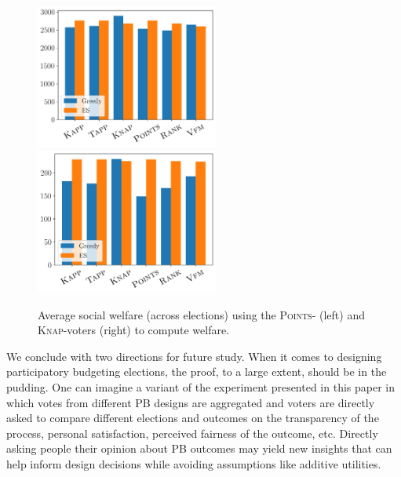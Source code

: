\documentclass[runningheads]{llncs}
\newcommand{\points}{\textsc{Points}}
\newcommand{\knap}{\textsc{Knap}}
\begin{document}
\begin{figure}[!t]
\begin{center}
\includegraphics[width=6cm]{experiment/Utilities_welfare.png}
\includegraphics[width=6cm]{experiment/Knapsack_welfare.png}

\caption{Average social welfare (across elections) using the \points- (left) and \knap-voters (right) to compute welfare.
}\label{fig:welfare}
\end{center}
\end{figure}

We conclude with  two directions for future study. %
When it comes to designing participatory budgeting elections, the proof, to a large extent, should be in the pudding.  %
One can imagine a  variant of the experiment presented in this paper in which votes from different PB designs are aggregated and voters are directly asked to compare different elections and outcomes on the transparency of the process, personal satisfaction, perceived fairness of the outcome, etc. 
Directly asking people their opinion about PB outcomes may yield new  insights   that can help inform design decisions while avoiding assumptions like  additive utilities. 
\end{document}
